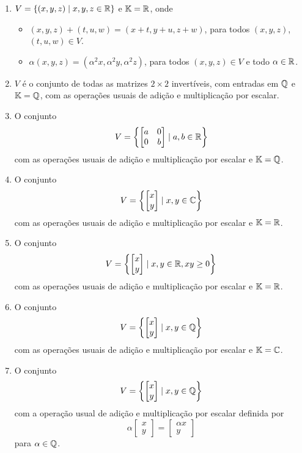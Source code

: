 \documentclass[12pt]{exam}
\begin{document}
\begin{exercicio}
\begin{enumerate}[label={\alph*)}]
    \item $V = \{(x, y, z) \mid x, y, z \in \mathbb{R}\}$ e $\mathbb{K} = \mathbb{R}$, onde
      \begin{itemize}
        \item $(x, y, z) + (t, u, w) = (x + t, y + u, z + w)$, para todos $(x, y, z)$, $(t, u, w) \in V$.
        \item $\alpha(x, y, z) = (\alpha^2 x, \alpha^2 y, \alpha^2 z)$, para todos $(x, y, z) \in V$ e todo $\alpha \in \mathbb{R}$.
      \end{itemize}

    \item $V$ é o conjunto de todas as matrizes $2 \times 2$ invertíveis, com entradas em $\mathbb{Q}$ e $\mathbb{K} = \mathbb{Q}$, com as operações usuais de adição e multiplicação por escalar.

    \item O conjunto
      \[
        V = \left\{\begin{bmatrix}a & 0\\0 & b \end{bmatrix} \mid a, b \in \mathbb{R}\right\}
      \]
      com as operações usuais de adição e multiplicação por escalar e $\mathbb{K} = \mathbb{Q}$.

    \item O conjunto
      \[
         V = \left\{\begin{bmatrix}x\\y \end{bmatrix} \mid x, y \in \mathbb{C}\right\}
      \]
      com as operações usuais de adição e multiplicação por escalar e $\mathbb{K} = \mathbb{R}$.

    \item O conjunto
      \[
         V = \left\{\begin{bmatrix}x\\y \end{bmatrix} \mid x, y \in \mathbb{R}, xy \ge 0\right\}
      \]
      com as operações usuais de adição e multiplicação por escalar e $\mathbb{K} = \mathbb{R}$.

    \item O conjunto
      \[
         V = \left\{\begin{bmatrix}x\\y \end{bmatrix} \mid x, y \in \mathbb{Q}\right\}
      \]
      com as operações usuais de adição e multiplicação por escalar e  $\mathbb{K} = \mathbb{C}$.

    \item O conjunto
      \[
         V = \left\{\begin{bmatrix}x\\y \end{bmatrix} \mid x, y \in \mathbb{Q}\right\}
      \]
      com a operação usual de adição e multiplicação por escalar definida por
      \[
        \alpha\begin{bmatrix}x\\y\end{bmatrix} = \begin{bmatrix}\alpha x\\y\end{bmatrix}
      \]
      para $\alpha \in \mathbb{Q}$.


\end{enumerate}
\end{exercicio}
\end{document}
